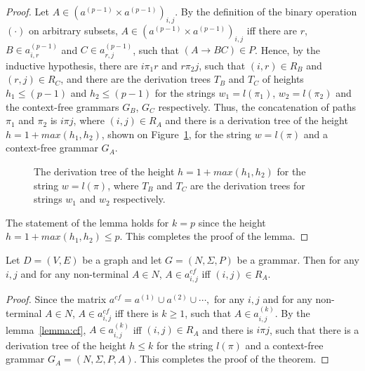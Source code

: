 \begin{proof}
Let $A \in (a^{(p-1)} \times a^{(p-1)})_{i,j}$. By the definition of the binary operation $(\cdot)$ on arbitrary subsets, $A \in (a^{(p-1)} \times a^{(p-1)})_{i,j}$ iff there are $r$, $B \in a^{(p-1)}_{i,r}$ and $C \in a^{(p-1)}_{r,j}$, such that $(A \rightarrow B C) \in P$. Hence, by the inductive hypothesis, there are $i \pi_1 r$ and $r \pi_2 j$, such that $(i,r) \in R_B$ and $(r,j) \in R_C$, and there are the derivation trees $T_B$ and $T_C$ of heights $h_1 \leq (p-1)$ and $h_2 \leq (p-1)$ for the strings $w_1 = l(\pi_1)$, $w_2 = l(\pi_2)$ and the context-free grammars $G_B$, $G_C$ respectively. Thus, the concatenation of paths $\pi_1$ and $\pi_2$ is $i \pi j$, where $(i,j) \in R_A$ and there is a derivation tree of the height $h = 1 + max(h_1, h_2)$, shown on Figure~\ref{tree2}, for the string $w = l(\pi)$ and a context-free grammar $G_A$.

\begin{figure}[h!]
	\centering
	\caption{The derivation tree of the height $h = 1 + max(h_1, h_2)$ for the string $w = l(\pi)$, where $T_B$ and $T_C$ are the derivation trees for strings $w_1$ and $w_2$ respectively.}
	\label{tree2}
\end{figure}

The statement of the lemma holds for $k = p$ since the height $h = 1 + max(h_1, h_2) \leq p$. This completes the proof of the lemma.
\end{proof}

\begin{mytheorem}\label{thm:correct}
 Let $D = (V,E)$ be a graph and let $G =(N,\Sigma,P)$ be a grammar. Then for any $i, j$ and for any non-terminal $A \in N$, $A \in a^{cf}_{i,j}$ iff $(i,j) \in R_A$.
\end{mytheorem}
\begin{proof}

Since the matrix $a^{cf} = a^{(1)} \cup a^{(2)} \cup \cdots,$ for any $i, j$ and for any non-terminal $A \in N$, $A \in a^{cf}_{i,j}$ iff there is $k \geq 1$, such that $A \in a^{(k)}_{i,j}$. By the lemma~\ref{lemma:cf}, $A \in a^{(k)}_{i,j}$ iff $(i,j) \in R_A$ and there is $i \pi j$, such that there is a derivation tree of the height $h \leq k$ for the string $l(\pi)$ and a context-free grammar $G_A = (N,\Sigma,P,A)$. This completes the proof of the theorem.
\end{proof}

